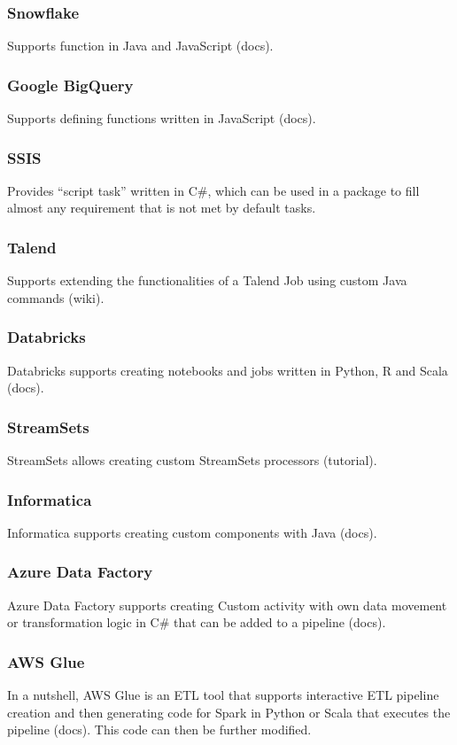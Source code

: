 \subsubsection{Snowflake}
Supports function in Java and JavaScript (docs).

\subsubsection{Google BigQuery}
Supports defining functions written in JavaScript (docs).

\subsubsection{SSIS}
Provides “script task” written in C\#, which can be used in a package to fill almost any requirement that is not met by default tasks.

\subsubsection{Talend}
Supports extending the functionalities of a Talend Job using custom Java commands (wiki).

\subsubsection{Databricks}
Databricks supports creating notebooks and jobs written in Python, R and Scala (docs).

\subsubsection{StreamSets}
StreamSets allows creating custom StreamSets processors (tutorial).

\subsubsection{Informatica}
Informatica supports creating custom components with Java (docs).

\subsubsection{Azure Data Factory}
Azure Data Factory supports creating Custom activity with own data movement or transformation logic in C\# that can be added to a pipeline (docs).

\subsubsection{AWS Glue}
In a nutshell, AWS Glue is an ETL tool that supports interactive ETL pipeline creation and then generating code for Spark in Python or Scala that executes the pipeline (docs). This code can then be further modified.

